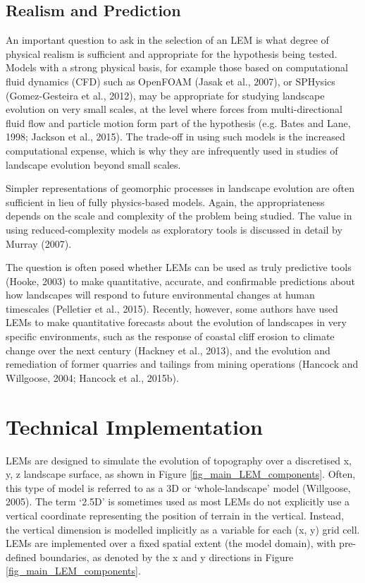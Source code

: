 \subsection{Realism and Prediction}

An important question to ask in the selection of an LEM is what degree of physical realism is sufficient and appropriate for the hypothesis being tested. Models with a strong physical basis, for example those based on computational fluid dynamics (CFD) such as OpenFOAM (Jasak et al., 2007), or SPHysics (Gomez-Gesteira et al., 2012), may be appropriate for studying landscape evolution on very small scales, at the level where forces from multi-directional fluid flow and particle motion form part of the hypothesis (e.g. Bates and Lane, 1998; Jackson et al., 2015). The trade-off in using such models is the increased computational expense, which is why they are infrequently used in studies of landscape evolution beyond small scales.

Simpler representations of geomorphic processes in landscape evolution are often sufficient in lieu of fully physics-based models. Again, the appropriateness depends on the scale and complexity of the problem being studied. The value in using reduced-complexity models as exploratory tools is discussed in detail by Murray (2007). 

The question is often posed whether LEMs can be used as truly predictive tools (Hooke, 2003) to make quantitative, accurate, and confirmable predictions about how landscapes will respond to future environmental changes at human timescales (Pelletier et al., 2015). Recently, however, some authors have used LEMs to make quantitative forecasts about the evolution of landscapes in very specific environments, such as the response of coastal cliff erosion to climate change over the next century (Hackney et al., 2013), and the evolution and remediation of former quarries and tailings from mining operations (Hancock and Willgoose, 2004; Hancock et al., 2015b).

\section{Technical Implementation}
LEMs are designed to simulate the evolution of topography over a discretised x, y, z landscape surface, as shown in Figure \ref{fig_main_LEM_components}. Often, this type of model is referred to as a 3D or `whole-landscape' model (Willgoose, 2005). The term `2.5D' is sometimes used as most LEMs do not explicitly use a vertical coordinate representing the position of terrain in the vertical. Instead, the vertical dimension is modelled implicitly as a variable for each (x, y) grid cell. LEMs are implemented over a fixed spatial extent (the model domain), with pre-defined boundaries, as denoted by the x and y directions in Figure \ref{fig_main_LEM_components}. 


